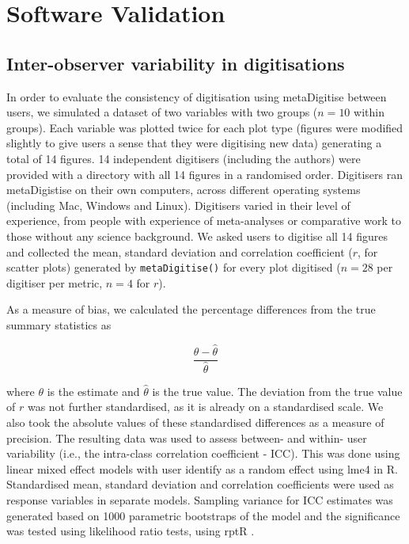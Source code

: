\documentclass[12pt]{article}
\newcommand{\fct}[1]{\texttt{#1()}}
\newcommand{\pkg}[1]{{\fontseries{b}\selectfont #1}}
\let\proglang=\textsf
\begin{document}
\section{Software Validation}

\subsection{Inter-observer variability in digitisations}

In order to evaluate the consistency of digitisation using \pkg{metaDigitise} between users, we simulated a dataset of two variables with two groups ($n=10$ within groups). Each variable was plotted twice for each plot type (figures were modified slightly to give users a sense that they were digitising new data) generating a total of 14 figures. 14 independent digitisers (including the authors) were provided with a directory with all 14 figures in a randomised order. Digitisers ran \pkg{metaDigistise} on their own computers, across different operating systems (including Mac, Windows and Linux). Digitisers varied in their level of experience, from people with experience of meta-analyses or comparative work to those without any science background. We asked users to digitise all 14 figures and collected the mean, standard deviation and correlation coefficient ($r$, for scatter plots) generated by \fct{metaDigitise} for every plot digitised ($n=28$ per digitiser per metric, $n=4$ for $r$). 

As a measure of bias, we calculated the percentage differences from the true summary statistics as

\begin{equation}
\frac{\theta - \hat{\theta}}{\hat{\theta}}
\end{equation}

where $\theta$ is the estimate and $\hat{\theta}$ is the true value. The deviation from the true value of $r$ was not further standardised, as it is already on a standardised scale. We also took the absolute values of these standardised differences as a measure of precision. The resulting data was used to assess between- and within- user variability (i.e., the intra-class correlation coefficient - ICC). This was done using linear mixed effect models with user identify as a random effect using \pkg{lme4} \citep{bates2015} in \proglang{R}. Standardised mean, standard deviation and correlation coefficients were used as response variables in separate models. Sampling variance for ICC estimates was generated based on 1000 parametric bootstraps of the model and the significance was tested using likelihood ratio tests, using \pkg{rptR} \citep{stoffel2017}.  
\end{document}

